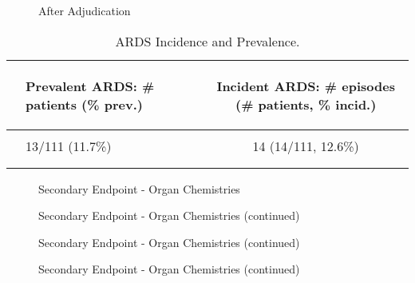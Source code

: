 \documentclass[dvips,10pt]{article}
\begin{document}
\begin{figure}
\caption{After Adjudication}
\end{figure}
\clearpage
\begin{table}[t]
\caption
{ ARDS Incidence and Prevalence. }
\begin{center}
\begin{tabular}{ @{}l@{}
@{}l@{}@{}p{1.5em}@{}@{}c@{}
}
\hline

& \parbox{6em}{\begin{center}Prevalent ARDS: \# patients (\% prev.)\end{center}} && \parbox{6em}{\begin{center}Incident ARDS: \# episodes (\# patients, \% incid.)\end{center}} \\

\hline

\\
& 13/111 (11.7\%) && 14 (14/111, 12.6\%) \\
\\
\hline \\

\end{tabular}

\end{center}
 \end{table}
\clearpage

\begin{figure}
\caption{Secondary Endpoint - Organ Chemistries}
\end{figure}
\clearpage

\begin{figure}
\caption{Secondary Endpoint - Organ Chemistries (continued)}
\end{figure}
\clearpage

\begin{figure}
\caption{Secondary Endpoint - Organ Chemistries (continued)}
\end{figure}
\clearpage

\begin{figure}
\caption{Secondary Endpoint - Organ Chemistries (continued)}
\end{figure}
\clearpage
\end{document}
